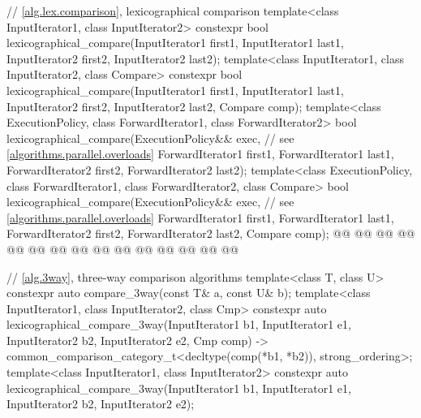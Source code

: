 \begin{codeblock}
{  // \ref{alg.lex.comparison}, lexicographical comparison
  template<class InputIterator1, class InputIterator2>
    constexpr bool
      lexicographical_compare(InputIterator1 first1, InputIterator1 last1,
                              InputIterator2 first2, InputIterator2 last2);
  template<class InputIterator1, class InputIterator2, class Compare>
    constexpr bool
      lexicographical_compare(InputIterator1 first1, InputIterator1 last1,
                              InputIterator2 first2, InputIterator2 last2,
                              Compare comp);
  template<class ExecutionPolicy, class ForwardIterator1, class ForwardIterator2>
    bool
      lexicographical_compare(ExecutionPolicy&& exec, // see \ref{algorithms.parallel.overloads}
                              ForwardIterator1 first1, ForwardIterator1 last1,
                              ForwardIterator2 first2, ForwardIterator2 last2);
  template<class ExecutionPolicy, class ForwardIterator1, class ForwardIterator2,
           class Compare>
    bool
      lexicographical_compare(ExecutionPolicy&& exec, // see \ref{algorithms.parallel.overloads}
                              ForwardIterator1 first1, ForwardIterator1 last1,
                              ForwardIterator2 first2, ForwardIterator2 last2,
                              Compare comp);
  @@
    @@
        @@
        @@
      @@
        @@
                                @@
    @@
        @@
        @@
          @@
      @@
        @@
                                @@
  @\added{\}}@

  // \ref{alg.3way}, three-way comparison algorithms
  template<class T, class U>
    constexpr auto compare_3way(const T& a, const U& b);
  template<class InputIterator1, class InputIterator2, class Cmp>
    constexpr auto
      lexicographical_compare_3way(InputIterator1 b1, InputIterator1 e1,
                                   InputIterator2 b2, InputIterator2 e2,
                                   Cmp comp)
        -> common_comparison_category_t<decltype(comp(*b1, *b2)), strong_ordering>;
  template<class InputIterator1, class InputIterator2>
    constexpr auto
      lexicographical_compare_3way(InputIterator1 b1, InputIterator1 e1,
                                   InputIterator2 b2, InputIterator2 e2);

}
\end{codeblock}

